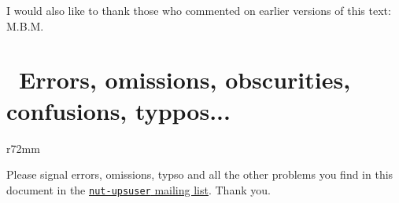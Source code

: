 \documentclass[12pt]{article}
\newlength{\headersep}\setlength{\headersep}{3mm}
\newcommand{\Hsep}{\hspace{\headersep}}
\newcommand{\mailinglist}{\href{https://lists.alioth.debian.org/mailman/listinfo/nut-upsuser}%
                               {\texttt{nut-upsuser} mailing list}}
\begin{document}
I would also like to thank those who commented on earlier versions of this
text: M.B.M.

\vspace*{\fill}

\begin{center}
\end{center}

\vspace*{\fill}



\section{\Hsep\ Errors, omissions, obscurities, confusions, typpos...}\label{bugs}

\begin{wrapfigure}[6]{r}{72mm}
\vspace{-3.5mm}
\end{wrapfigure}

Please signal errors, omissions, typso and all the other problems you find in
this document in the \mailinglist.  Thank you.

\vspace{10mm}
\hspace{30mm}

\vspace*{\fill}

\label{LastPage}
\end{document}
